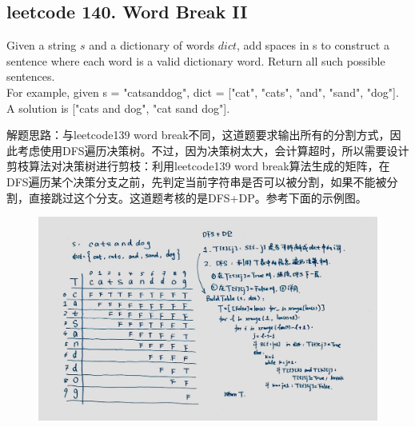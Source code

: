 \documentclass[a4paper,10pt]{article}
\begin{document}
\subsection{leetcode 140. Word Break II}
Given a string $s$ and a dictionary of words $dict$, add spaces in s to construct a sentence where each word is a valid dictionary word. Return all such possible sentences. \\

\noindent For example, given s = "catsanddog", dict = ["cat", "cats", "and", "sand", "dog"]. A solution is ["cats and dog", "cat sand dog"]. \\

\begin{CJK*}{UTF8}{gbsn}
\noindent 解题思路：与leetcode139 word break不同，这道题要求输出所有的分割方式，因此考虑使用DFS遍历决策树。不过，因为决策树太大，会计算超时，所以需要设计剪枝算法对决策树进行剪枝：利用leetcode139 word break算法生成的矩阵，在DFS遍历某个决策分支之前，先判定当前字符串是否可以被分割，如果不能被分割，直接跳过这个分支。这道题考核的是DFS+DP。参考下面的示例图。
\end{CJK*}

\begin{figure}[h]
\includegraphics[width=\textwidth]{leetcode140.jpg}
\centering \\
\end{figure}
\end{document}
